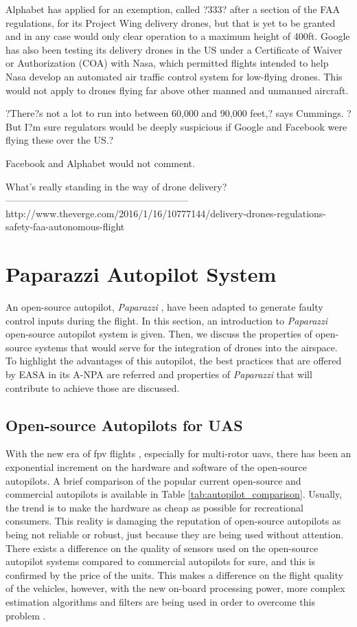Alphabet has applied for an exemption, called ?333? after a section of the FAA regulations, for its Project Wing delivery drones, but that is yet to be granted and in any case would only clear operation to a maximum height of 400ft. Google has also been testing its delivery drones in the US under a Certificate of Waiver or Authorization (COA) with Nasa, which permitted flights intended to help Nasa develop an automated air traffic control system for low-flying drones. This would not apply to drones flying far above other manned and unmanned aircraft.

?There?s not a lot to run into between 60,000 and 90,000 feet,? says Cummings. ?But I?m sure regulators would be deeply suspicious if Google and Facebook were flying these over the US.?

Facebook and Alphabet would not comment.

What's really standing in the way of drone delivery?
---------------------------------------------------------
http://www.theverge.com/2016/1/16/10777144/delivery-drones-regulations-safety-faa-autonomous-flight
\fi

\section{Paparazzi Autopilot System}
An open-source autopilot, \emph{Paparazzi} \cite{brisset2006paparazzi}, have been adapted to generate faulty control inputs during the flight. 
In this section, an introduction to \emph{Paparazzi} open-source autopilot system is given. Then, we discuss the properties of open-source systems that would serve for the integration of drones into the airspace. To highlight the advantages of this autopilot, the best practices that are offered by EASA in its A-NPA \cite{A_NPA_EASA2015} are referred and properties of \emph{Paparazzi} that will contribute to achieve those are discussed.

\subsection{Open-source Autopilots for UAS}
With the new era of \gls{fpv} flights \cite{whatIsFPV}, especially for multi-rotor \gls{uav}s, there has been an exponential increment on the hardware and software of the open-source autopilots. A brief comparison of the popular current open-source and commercial autopilots is available in Table \ref{tab:autopilot_comparison}. Usually, the trend is to make the hardware as cheap as possible for recreational consumers. This reality is damaging the reputation of open-source autopilots as being not reliable or robust, just because they are being used without attention. There exists a difference on the quality of sensors used on the open-source autopilot systems compared to commercial autopilots for sure, and this is confirmed by the price of the units. This makes a difference on the flight quality of the vehicles, however, with the new on-board processing power, more complex estimation algorithms and filters are being used in order to overcome this problem \cite{baskaya2016flexible}.

